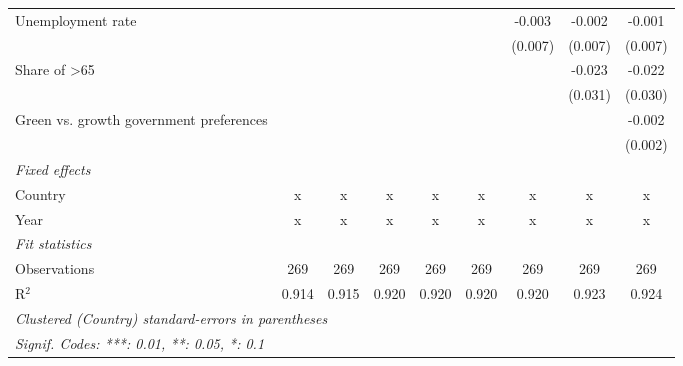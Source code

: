 \begin{table}[htbp]
\begin{tabular}{lcccccccc}
      Unemployment rate                        &              &              &             &             &             & -0.003      & -0.002  & -0.001\\   
                                               &              &              &             &             &             & (0.007)     & (0.007) & (0.007)\\   
      Share of >65                             &              &              &             &             &             &             & -0.023  & -0.022\\   
                                               &              &              &             &             &             &             & (0.031) & (0.030)\\   
      Green vs. growth government preferences  &              &              &             &             &             &             &         & -0.002\\   
                                               &              &              &             &             &             &             &         & (0.002)\\   
      \emph{Fixed effects}\\
      Country                                  & x            & x            & x           & x           & x           & x           & x       & x\\  
      Year                                     & x            & x            & x           & x           & x           & x           & x       & x\\  
      \midrule \emph{Fit statistics}\\
      Observations                             & 269          & 269          & 269         & 269         & 269         & 269         & 269     & 269\\  
      R$^2$                                    & 0.914        & 0.915        & 0.920       & 0.920       & 0.920       & 0.920       & 0.923   & 0.924\\  
      \midrule
      \multicolumn{9}{l}{\emph{Clustered (Country) standard-errors in parentheses}}\\
      \multicolumn{9}{l}{\emph{Signif. Codes: ***: 0.01, **: 0.05, *: 0.1}}\\
   \end{tabular}
\end{table}


